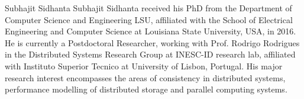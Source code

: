 \documentclass[journal,compsoc]{IEEEtran}
\begin{document}
%
 \begin{IEEEbiography}{Subhajit Sidhanta}
 Subhajit Sidhanta received his PhD from the Department of Computer Science and Engineering
 LSU, affiliated with the School of Electrical Engineering and Computer Science at Louisiana State University, USA, in 2016. He is currently a Postdoctoral Researcher, working with Prof. Rodrigo Rodrigues in the Distributed Systems Research Group at INESC-ID research lab, affiliated with Instituto Superior Tecnico at University of Lisbon, Portugal. His major research interest encompasses the areas of consistency in distributed systems, performance modelling of distributed storage and parallel computing systems.
 \end{IEEEbiography}
\end{document}
